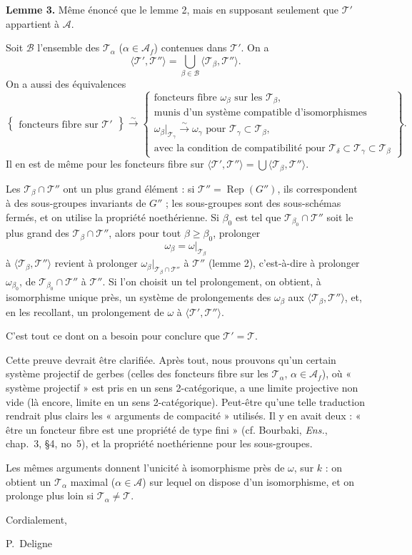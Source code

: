 \documentclass[11pt]{article}
\newcommand{\T}{\mathcal T}
\newcommand{\A}{\mathcal A}
\newcommand{\Af}{\mathcal A_f}
\newcommand{\Rep}{\operatorname{Rep}}
\begin{document}
\textbf{Lemme 3.} Même énoncé que le lemme 2, mais en supposant seulement que \(\T'\) appartient à \(\A\).

Soit \(\mathcal B\) l'ensemble des \(\T_\alpha\) (\(\alpha\in\Af\)) contenues dans \(\T'\). On a
\[
\langle\T',\T''\rangle=\bigcup_{\beta\in\mathcal B}\langle\T_\beta,\T''\rangle.
\]
On a aussi des équivalences
\[
\left\{
\begin{array}{c}
\text{foncteurs fibre sur }\T'
\end{array}
\right\}
\xrightarrow{\sim}
\left\{
\begin{array}{c}
\text{foncteurs fibre }\omega_\beta\text{ sur les }\T_\beta,\\
\text{munis d'un système compatible d'isomorphismes }\\
\omega_\beta|_{\T_\gamma}\xrightarrow{\sim}\omega_\gamma\text{ pour }\T_\gamma\subset\T_\beta,\\
\text{avec la condition de compatibilité pour }\T_\delta\subset\T_\gamma\subset\T_\beta
\end{array}
\right\}.
\]
Il en est de même pour les foncteurs fibre sur \(\langle\T',\T''\rangle=\bigcup\langle\T_\beta,\T''\rangle\).

Les \(\T_\beta\cap\T''\) ont un plus grand élément : si \(\T''=\Rep(G'')\), ils correspondent à des sous-groupes invariants de \(G''\) ; les sous-groupes sont des sous-schémas fermés, et on utilise la propriété noethérienne. Si \(\beta_0\) est tel que \(\T_{\beta_0}\cap\T''\) soit le plus grand des \(\T_\beta\cap\T''\), alors pour tout \(\beta\geq\beta_0\), prolonger
\[
\omega_\beta=\omega|_{\T_\beta}
\]
à \(\langle\T_\beta,\T''\rangle\) revient à prolonger \(\omega_\beta|_{\T_\beta\cap\T''}\) à \(\T''\) (lemme 2), c'est-à-dire à prolonger \(\omega_{\beta_0}\), de \(\T_{\beta_0}\cap\T''\) à \(\T''\). Si l'on choisit un tel prolongement, on obtient, à isomorphisme unique près, un système de prolongements des \(\omega_\beta\) aux \(\langle\T_\beta,\T''\rangle\), et, en les recollant, un prolongement de \(\omega\) à \(\langle\T',\T''\rangle\).

C'est tout ce dont on a besoin pour conclure que \(\T'=\T\).

Cette preuve devrait être clarifiée. Après tout, nous prouvons qu'un certain système projectif de gerbes (celles des foncteurs fibre sur les \(\T_\alpha\), \(\alpha\in\Af\)), où « système projectif » est pris en un sens 2-catégorique, a une limite projective non vide (là encore, limite en un sens 2-catégorique). Peut-être qu'une telle traduction rendrait plus clairs les « arguments de compacité » utilisés. Il y en avait deux : « être un foncteur fibre est une propriété de type fini » (cf. Bourbaki, \emph{Ens.}, chap.~3, \S4, no~5), et la propriété noethérienne pour les sous-groupes.

Les mêmes arguments donnent l'unicité à isomorphisme près de \(\omega\), sur \(k\) : on obtient un \(\T_\alpha\) maximal (\(\alpha\in\A\)) sur lequel on dispose d'un isomorphisme, et on prolonge plus loin si \(\T_\alpha\neq\T\).

Cordialement,

P.~Deligne
\end{document}

